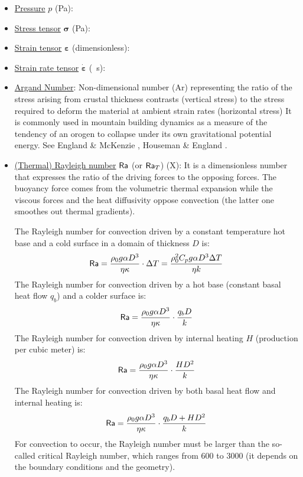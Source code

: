 \begin{itemize}
\item \underline{Pressure} $p$ (\si{\pascal}):
\item \underline{Stress tensor} ${\bm \sigma}$ (\si{\pascal}): 
\item \underline{Strain tensor} ${\bm \varepsilon}$ (dimensionless): 
\item \underline{Strain rate tensor} $ \dot{\bm \varepsilon}$ (\si{\per\second}): 

\item \underline{Argand Number}: 
Non-dimensional number (Ar) representing the ratio of the stress arising 
from crustal thickness
contrasts (vertical stress) to the stress required to deform
the material at ambient strain rates (horizontal stress)
It is commonly used in mountain building
dynamics as a measure of the tendency of an orogen to
collapse under its own gravitational potential energy.
See England \& McKenzie \cite{enmc82}, Houseman \& England \cite{hoen86a}.

\item \underline{(Thermal) Rayleigh number} ${\mathsf{Ra}}$ (or ${\mathsf{Ra}}_T$) (X): 
It is a dimensionless number that expresses the	ratio of the driving forces to the opposing forces.
The buoyancy force comes from the volumetric thermal expansion while the viscous forces and 
the heat diffusivity oppose convection (the latter one smoothes out thermal gradients). 

The Rayleigh number for convection driven by a constant temperature hot base and a cold surface
in a domain of thickness $D$ is:
\[
{\mathsf{Ra}} 
= \frac{\rho_0 g \alpha D^3 }{\eta \kappa}  \cdot  \Delta T
= \frac{\rho_0^2 C_p g \alpha D^3 \Delta T}{\eta k}
\]
The Rayleigh number for convection driven by a hot base (constant basal heat flow $q_b$)
and a colder surface is:
\[
{\mathsf{Ra}} = \frac{\rho_0 g \alpha D^3}{\eta \kappa } \cdot  \frac{q_b D}{k}
\]  
The Rayleigh number for convection driven by internal heating $H$ (production per cubic meter) is:
\[
{\mathsf{Ra}} = \frac{\rho_0 g \alpha D^3}{\eta \kappa} \cdot  \frac{H D^2}{k }
\]
The Rayleigh number for convection driven by both basal heat flow and internal heating is:	
\[
{\mathsf{Ra}} = \frac{\rho_0 g \alpha D^3}{\eta \kappa} \cdot  \frac{q_b D + H D^2}{k }
\]
For convection to occur, the Rayleigh number must be larger than the so-called critical 
Rayleigh number, which ranges from 600 to 3000 (it depends on the boundary conditions and the 
geometry).


\end{itemize}
